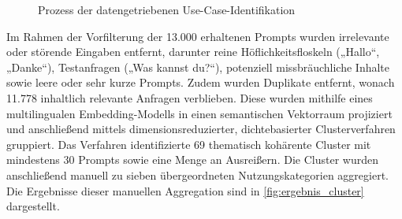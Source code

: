 \begin{figure}[H]
\centering
{}
\caption{Prozess der datengetriebenen Use-Case-Identifikation}
\label{fig:prozessfluss}
\end{figure}
\noindent
Im Rahmen der Vorfilterung der 13.000 erhaltenen Prompts wurden irrelevante oder störende Eingaben entfernt, darunter reine Höflichkeitsfloskeln („Hallo“, „Danke“), Testanfragen („Was kannst du?“), potenziell missbräuchliche Inhalte sowie leere oder sehr kurze Prompts. Zudem wurden Duplikate entfernt, wonach 11.778 inhaltlich relevante Anfragen verblieben. Diese wurden mithilfe eines multilingualen Embedding-Modells in einen semantischen Vektorraum projiziert und anschließend mittels dimensionsreduzierter, dichtebasierter Clusterverfahren gruppiert. Das Verfahren identifizierte 69 thematisch kohärente Cluster mit mindestens 30 Prompts sowie eine Menge an Ausreißern. Die Cluster wurden anschließend manuell zu sieben übergeordneten Nutzungskategorien aggregiert. Die Ergebnisse dieser manuellen Aggregation sind in \autoref{fig:ergebnis_cluster} dargestellt.

